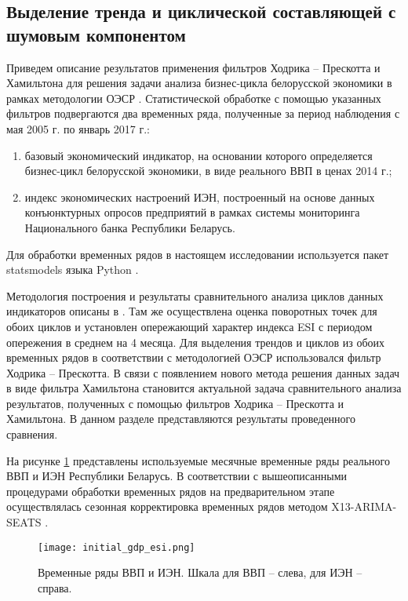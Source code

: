 \documentclass[a4paper,14pt]{extreport}
\begin{document}
	\subsection{Выделение тренда и циклической составляющей с шумовым компонентом}
	
	Приведем описание результатов применения фильтров Ходрика -- Прескотта и Хамильтона для решения задачи анализа бизнес-цикла белорусской экономики в рамках методологии ОЭСР \cite{oecdCycleExtraction}. Статистической обработке с помощью указанных фильтров подвергаются два временных ряда, полученные за период наблюдения с мая 2005 г. по январь 2017 г.: 
	
	\begin{enumerate}
		\item базовый экономический индикатор, на основании которого определяется бизнес-цикл белорусской экономики, в виде реального ВВП в ценах 2014 г.;
		\item индекс экономических настроений ИЭН, построенный на основе данных конъюнктурных опросов предприятий в рамках системы мониторинга Национального банка Республики Беларусь.
	\end{enumerate}

	Для обработки временных рядов в настоящем исследовании используется пакет statsmodels языка Python \cite{statsmodels}.
	
	Методология построения и результаты сравнительного анализа циклов данных индикаторов описаны в \cite{esiMakingAlt}. Там же осуществлена оценка поворотных точек для обоих циклов и установлен опережающий характер индекса ESI с периодом опережения в среднем на 4 месяца. Для выделения трендов и циклов из обоих временных рядов в соответствии с методологией ОЭСР \cite{schuler_detrend} использовался фильтр Ходрика -- Прескотта. В связи с появлением нового метода решения данных задач в виде фильтра Хамильтона становится актуальной задача сравнительного анализа результатов, полученных с помощью фильтров Ходрика -- Прескотта и Хамильтона. В данном разделе представляются результаты проведенного сравнения. 
	
	На рисунке \ref{fig:inital_gdp_esi} представлены используемые месячные временные ряды реального ВВП и ИЭН Республики Беларусь. В соответствии с вышеописанными процедурами обработки временных рядов на предварительном этапе осуществлялась сезонная корректировка временных рядов методом X13-ARIMA-SEATS \cite{seasonalManual}.
	
	
	\begin{figure}
		\texttt{[image: initial\_gdp\_esi.png]}
		\caption{
			Временные ряды ВВП и ИЭН. 
			Шкала для ВВП -- слева, для ИЭН -- справа. 
		}
		\label{fig:inital_gdp_esi}
	\end{figure} 
\end{document}
